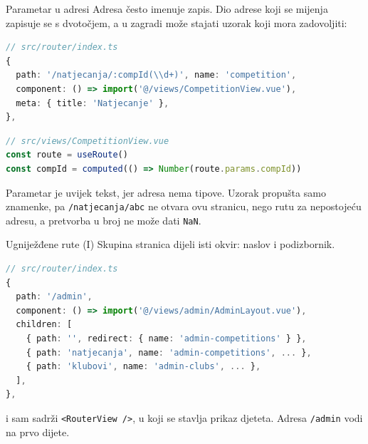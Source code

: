 \begin{frame}[fragile]{Parametar u adresi}
Adresa često imenuje zapis. Dio adrese koji se mijenja zapisuje se s dvotočjem, a u zagradi može stajati uzorak koji mora zadovoljiti:

\begin{lstlisting}[language=typescript]
// src/router/index.ts
{
  path: '/natjecanja/:compId(\\d+)', name: 'competition',
  component: () => import('@/views/CompetitionView.vue'),
  meta: { title: 'Natjecanje' },
},
\end{lstlisting}

\vspace{-0.2em}
\begin{lstlisting}[language=typescript]
// src/views/CompetitionView.vue
const route = useRoute()
const compId = computed(() => Number(route.params.compId))
\end{lstlisting}

\vspace{0.1em}
Parametar je uvijek tekst, jer adresa nema tipove. Uzorak propušta samo znamenke, pa \texttt{/natjecanja/abc} ne otvara ovu stranicu, nego rutu za nepostojeću adresu, a pretvorba u broj ne može dati \texttt{NaN}.
\end{frame}

\begin{frame}[fragile]{Ugniježđene rute (I)}
Skupina stranica dijeli isti okvir: naslov i podizbornik.

\begin{lstlisting}[language=typescript]
// src/router/index.ts
{
  path: '/admin',
  component: () => import('@/views/admin/AdminLayout.vue'),
  children: [
    { path: '', redirect: { name: 'admin-competitions' } },
    { path: 'natjecanja', name: 'admin-competitions', ... },
    { path: 'klubovi', name: 'admin-clubs', ... },
  ],
},
\end{lstlisting}

\vspace{0.2em}
 i sam sadrži \texttt{<RouterView />}, u koji se stavlja prikaz djeteta. Adresa \texttt{/admin} vodi na prvo dijete.
\end{frame}

